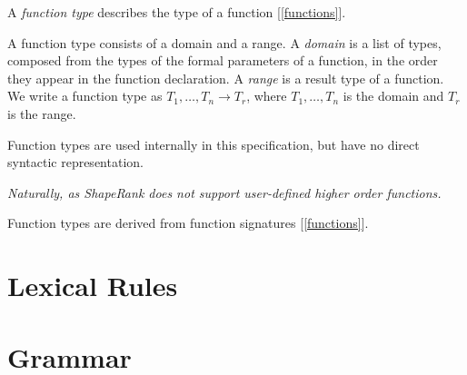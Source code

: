 \documentclass{article}
\begin{document}
A {\em function type} describes the type of a function [\ref{functions}].

A function type consists of a domain and a range. A {\em domain} is a list of types, composed from the types of the formal parameters of a function, in the order they appear in the function declaration. A {\em range} is a result type of a function. 
We write a  function type as $T_1, \ldots, T_n \to T_r$, where $T_1, \ldots, T_n$ is the domain and $T_r$ is the range.

Function types are used internally in this specification, but have no direct syntactic representation.

{\em 
Naturally, as ShapeRank does not support user-defined higher order functions.

Function types  are derived from function signatures [\ref{functions}].
}



\section{Lexical Rules}
\label{lexicalRules}
\printlexitable

\section{Grammar}
\label{grammar}
\printgrammartable
\end{document}
